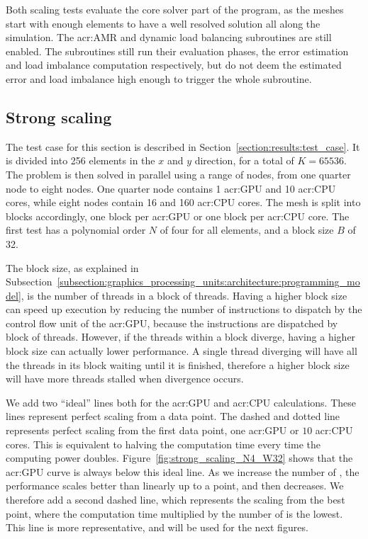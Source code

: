 Both scaling tests evaluate the core solver part of the program, as the meshes start with enough
elements to have a well resolved solution all along the simulation. The \acrlong{acr:AMR} and
dynamic load balancing subroutines are still enabled. The subroutines still run their evaluation
phases, the error estimation and load imbalance computation respectively, but do not deem the
estimated error and load imbalance high enough to trigger the whole subroutine. 

\subsection{Strong scaling}\label{subsection:results:scaling_tests:strong}

The test case for this section is described in Section~\ref{section:results:test_case}. It is
divided into 256 elements in the \(x\) and \(y\) direction, for a total of \(K = 65536\). The
problem is then solved in parallel using a range of nodes, from one quarter node to eight nodes. One
quarter node contains 1 \acrshort{acr:GPU} and 10 \acrshort{acr:CPU} cores, while eight nodes
contain 16  and 160 \acrshort{acr:CPU} cores. The mesh is split into blocks
accordingly, one block per \acrshort{acr:GPU} or one block per \acrshort{acr:CPU} core. The first
test has a polynomial order \(N\) of four for all elements, and a block size \(B\) of 32. 

The block size, as explained in
Subsection~\ref{subsection:graphics_processing_units:architecture:programming_model}, is the number
of threads in a block of threads. Having a higher block size can speed up execution by reducing the
number of instructions to dispatch by the control flow unit of the \acrshort{acr:GPU}, because the
instructions are dispatched by block of threads. However, if the threads within a block diverge,
having a higher block size can actually lower performance. A single thread diverging will have all
the threads in its block waiting until it is finished, therefore a higher block size will have more
threads stalled when divergence occurs.

We add two ``ideal'' lines both for the \acrshort{acr:GPU} and \acrshort{acr:CPU} calculations.
These lines represent perfect scaling from a data point. The dashed and dotted line represents
perfect scaling from the first data point, one \acrshort{acr:GPU} or \(10\) \acrshort{acr:CPU}
cores. This is equivalent to halving the computation time every time the computing power doubles.
Figure~\ref{fig:strong_scaling_N4_W32} shows that the \acrshort{acr:GPU} curve is always below this
ideal line. As we increase the number of , the performance scales better than
linearly up to a point, and then decreases. We therefore add a second dashed line, which represents
the scaling from the best point, where the computation time multiplied by the number of
 is the lowest. This line is more representative, and will be used for the next
figures.

